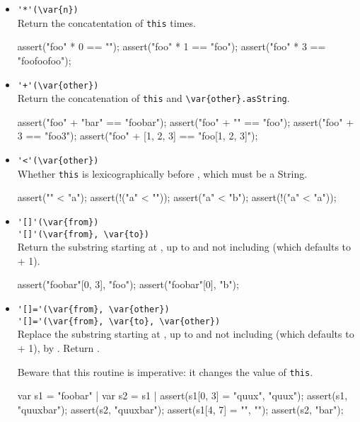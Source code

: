 \begin{itemize}
\item \lstinline|'*'(\var{n})|\\
  Return the concatentation of \lstinline|this|  times.
\begin{urbiscript}[firstnumber=last]
assert("foo" * 0 == "");
assert("foo" * 1 == "foo");
assert("foo" * 3 == "foofoofoo");
\end{urbiscript}

\item \lstinline|'+'(\var{other})|\\
  Return the concatenation of \lstinline|this| and
  \lstinline|\var{other}.asString|.
\begin{urbiscript}[firstnumber=last]
assert("foo" + "bar" == "foobar");
assert("foo" + "" == "foo");
assert("foo" + 3 == "foo3");
assert("foo" + [1, 2, 3] == "foo[1, 2, 3]");
\end{urbiscript}

\item \lstinline|'<'(\var{other})|\\
  Whether \lstinline|this| is lexicographically before ,
  which must be a String.
\begin{urbiscript}[firstnumber=last]
assert("" < "a");
assert(!("a" < ""));
assert("a" < "b");
assert(!("a" < "a"));
\end{urbiscript}

\item \lstinline|'[]'(\var{from})|\\
  \lstinline|'[]'(\var{from}, \var{to})|\\
  Return the substring starting at , up to and not including
   (which defaults to  + 1).
\begin{urbiscript}[firstnumber=last]
assert("foobar"[0, 3], "foo");
assert("foobar"[0], "b");
\end{urbiscript}

\item \lstinline|'[]='(\var{from}, \var{other})|\\
  \lstinline|'[]='(\var{from}, \var{to}, \var{other})|\\
  Replace the substring starting at , up to and not including
   (which defaults to  + 1), by .  Return
  .

  Beware that this routine is imperative: it changes the value of
  \lstinline|this|.
\begin{urbiscript}[firstnumber=last]
var s1 = "foobar" | var s2 = s1 |
assert(s1[0, 3] = "quux", "quux");
assert(s1, "quuxbar");
assert(s2, "quuxbar");
assert(s1[4, 7] = "", "");
assert(s2, "bar");
\end{urbiscript}
\end{itemize}

